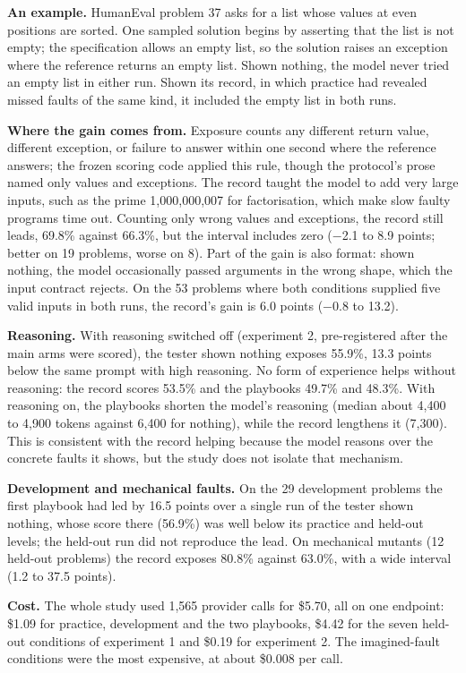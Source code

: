 \documentclass[11pt]{article}
\begin{document}
\textbf{An example.} HumanEval problem 37 asks for a list whose values at even
positions are sorted. One sampled solution begins by asserting that the list is
not empty; the specification allows an empty list, so the solution raises an
exception where the reference returns an empty list. Shown nothing, the model never
tried an empty list in either run. Shown its record, in which practice had revealed
missed faults of the same kind, it included the empty list in both runs.

\textbf{Where the gain comes from.} Exposure counts any different return value,
different exception, or failure to answer within one second where the reference
answers; the frozen scoring code applied this rule, though the protocol's prose
named only values and exceptions. The record taught the model to add very large
inputs, such as the prime 1{,}000{,}000{,}007 for factorisation, which make slow faulty
programs time out. Counting only wrong values and exceptions, the record still leads,
69.8\% against 66.3\%, but the interval includes zero ($-$2.1 to 8.9 points; better on
19 problems, worse on 8). Part of the gain is also format: shown nothing, the model
occasionally passed arguments in the wrong shape, which the input contract rejects.
On the 53 problems where both conditions supplied five valid inputs in both runs,
the record's gain is 6.0 points ($-$0.8 to 13.2).

\textbf{Reasoning.} With reasoning switched off (experiment 2, pre-registered after
the main arms were scored), the tester shown nothing exposes 55.9\%, 13.3 points
below the same prompt with high reasoning. No form of experience helps without
reasoning: the record scores 53.5\% and the playbooks 49.7\% and 48.3\%. With
reasoning on, the playbooks shorten the model's reasoning (median about 4{,}400 to
4{,}900 tokens against 6{,}400 for nothing), while the record lengthens it (7{,}300).
This is consistent with the record helping because the model reasons over the
concrete faults it shows, but the study does not isolate that mechanism.

\textbf{Development and mechanical faults.} On the 29 development problems the
first playbook had led by 16.5 points over a single run of the tester shown nothing,
whose score there (56.9\%) was well below its practice and held-out levels; the
held-out run did not reproduce the lead. On mechanical mutants (12 held-out
problems) the record exposes 80.8\% against 63.0\%, with a wide interval (1.2 to 37.5
points).

\textbf{Cost.} The whole study used 1{,}565 provider calls for \$5.70, all on one
endpoint: \$1.09 for practice, development and the two playbooks, \$4.42 for the
seven held-out conditions of experiment 1 and \$0.19 for experiment 2. The
imagined-fault conditions were the most expensive, at about \$0.008 per call.
\end{document}
